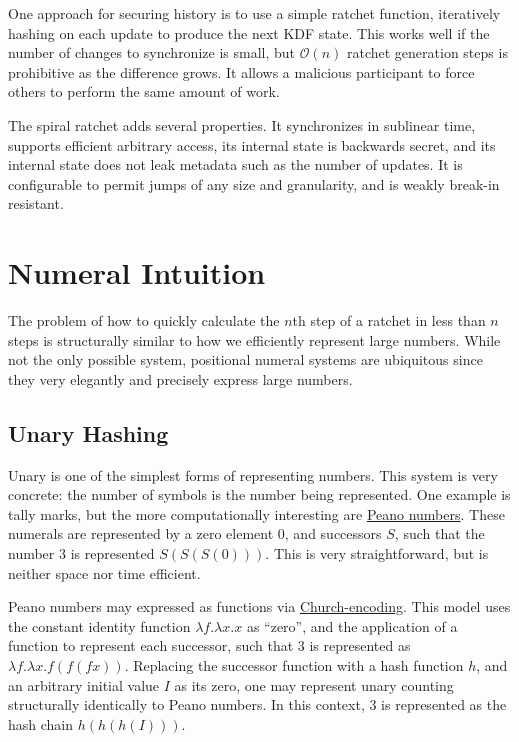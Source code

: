 \documentclass{article}
\begin{document}
    One approach for securing history is to use a simple ratchet function, iteratively hashing on each update to produce the next KDF state. This works well if the number of changes to synchronize is small, but $\mathcal{O}(n)$ ratchet generation steps is prohibitive as the difference grows. It allows a malicious participant to force others to perform the same amount of work.
    
    The spiral ratchet adds several properties. It synchronizes in sublinear time, supports efficient arbitrary access, its internal state is backwards secret, and its internal state does not leak metadata such as the number of updates. It is configurable to permit jumps of any size and granularity, and is weakly break-in resistant.
    
    \section{Numeral Intuition}
    
    The problem of how to quickly calculate the $n$th step of a ratchet in less than $n$ steps is structurally similar to how we efficiently represent large numbers. While not the only possible system, positional numeral systems are ubiquitous since they very elegantly and precisely express large numbers.
    
    \subsection{Unary Hashing}
   
    Unary is one of the simplest forms of representing numbers. This system is very concrete: the number of symbols is the number being represented. One example is tally marks, but the more computationally interesting are \href{https://en.wikipedia.org/wiki/Peano_axioms#Arithmetic}{Peano numbers}. These numerals are represented by a zero element 0, and successors $S$, such that the number 3 is represented $S(S(S(0)))$. This is very straightforward, but is neither space nor time efficient. 
    
	Peano numbers may expressed as functions via \href{https://en.wikipedia.org/wiki/Church_encoding}{Church-encoding}. This model uses the constant identity function $\lambda{f}.\lambda{x}.x$ as ``zero'', and the application of a function to represent each successor, such that 3 is represented as $\lambda{f}.\lambda{x}.f(f(f x))$. Replacing the successor function with a hash function $h$, and an arbitrary initial value $I$ as its zero, one may represent unary counting structurally identically to Peano numbers. In this context, 3 is represented as the hash chain $h(h(h(I)))$.
	
\end{document}
